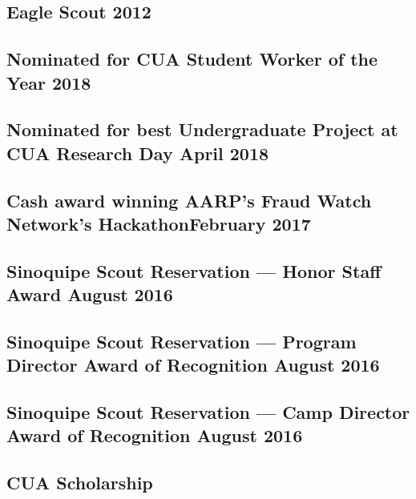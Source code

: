 \documentclass{article}
\begin{document}
\subsection{Eagle Scout \hfill 2012}
\subsection{Nominated for CUA Student Worker of the Year \hfill 2018}
\subsection{Nominated for best Undergraduate Project at CUA Research Day \hfill April 2018}
\subsection{Cash award winning AARP's Fraud Watch Network's Hackathon\hfill February 2017}
\subsection{Sinoquipe Scout Reservation --- Honor Staff Award \hfill August 2016}
\subsection{Sinoquipe Scout Reservation --- Program Director Award of Recognition \hfill August 2016}
\subsection{Sinoquipe Scout Reservation --- Camp Director Award of Recognition \hfill August 2016}
\subsection{CUA Scholarship }
\end{document}
